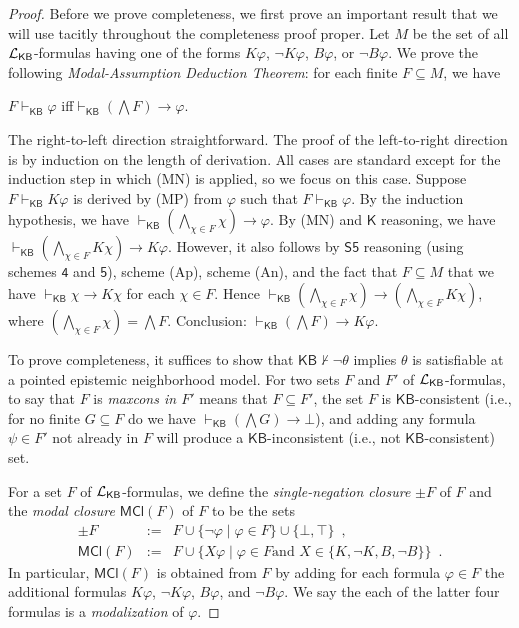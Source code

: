 \documentclass[12pt]{article}
\theoremstyle{definition}
\newcommand{\Lang}{{\cal L}}   %
\newcommand{\KB}{{\mathsf{KB}}}                 %
\newcommand{\MCl}{\mathsf{MCl}}                   %
\begin{document}
\begin{proof}
  Before we prove completeness, we first prove an important result
  that we will use tacitly throughout the completeness proof
  proper. Let $M$ be the set of all $\Lang_\KB$-formulas having one of
  the forms $K\varphi$, $\lnot K\varphi$, $B\varphi$, or
  $\lnot B\varphi$.  We prove the following \emph{Modal-Assumption
    Deduction Theorem\/}: for each finite $F\subseteq M$, we have
  \begin{center}
    $F\vdash_\KB\varphi$ \quad{}iff\quad $\vdash_\KB(\bigwedge
    F)\to\varphi$\enspace.
  \end{center}
  The right-to-left direction straightforward. The proof of the
  left-to-right direction is by induction on the length of derivation.
  All cases are standard except for the induction step in which (MN)
  is applied, so we focus on this case.  Suppose
  $F\vdash_\KB K\varphi$ is derived by (MP) from $\varphi$ such that
  $F\vdash_\KB\varphi$. By the induction hypothesis, we have
  $\vdash_\KB (\bigwedge_{\chi\in F}\chi)\to\varphi$.  By (MN) and
  $\mathsf{K}$ reasoning, we have
  $\vdash_\KB (\bigwedge_{\chi\in F}K\chi)\to K\varphi$.  However, it
  also follows by $\mathsf{S5}$ reasoning (using schemes $\mathsf{4}$
  and $\mathsf{5}$), scheme (Ap), scheme (An), and the fact that
  $F\subseteq M$ that we have $\vdash_\KB\chi\to K\chi$ for each
  $\chi\in F$.  Hence
  $\vdash_\KB(\bigwedge_{\chi\in F}\chi)\to(\bigwedge_{\chi\in
    F}K\chi)$,
  where $(\bigwedge_{\chi\in F}\chi)=\bigwedge F$.  Conclusion:
  $\vdash_\KB(\bigwedge F)\to K\varphi$.

  To prove completeness, it suffices to show that
  $\KB\nvdash\lnot\theta$ implies $\theta$ is satisfiable at a pointed
  epistemic neighborhood model. For two sets $F$ and $F'$ of
  $\Lang_\KB$-formulas, to say that $F$ is \emph{maxcons in $F'$}
  means that $F\subseteq F'$, the set $F$ is $\KB$-consistent (i.e.,
  for no finite $G\subseteq F$ do we have
  $\vdash_\KB (\bigwedge G)\to\bot$), and adding any formula
  $\psi\in F'$ not already in $F$ will produce a $\KB$-inconsistent
  (i.e., not $\KB$-consistent) set. 

  For a set $F$ of $\Lang_\KB$-formulas, we define the
  \emph{single-negation closure} $\pm F$ of $F$ and the \emph{modal
    closure} $\MCl(F)$ of $F$ to be the sets
  \begin{eqnarray*}
    \pm F &:=& 
               F\cup \{\lnot\varphi\mid\varphi\in F\} \cup
               \{\bot,\top\}
               \enspace,
    \\
    \MCl(F) &:=& 
                 F\cup
                 \{X\varphi\mid \varphi\in F\text{
                 and } X\in\{K,\lnot K,B,\lnot B\}\}\enspace.
  \end{eqnarray*}
  In particular, $\MCl(F)$ is obtained from $F$ by adding for each
  formula $\varphi\in F$ the additional formulas $K\varphi$,
  $\lnot K\varphi$, $B\varphi$, and $\lnot B\varphi$.  We say the each
  of the latter four formulas is a \emph{modalization} of $\varphi$.


\end{proof}
\end{document}
